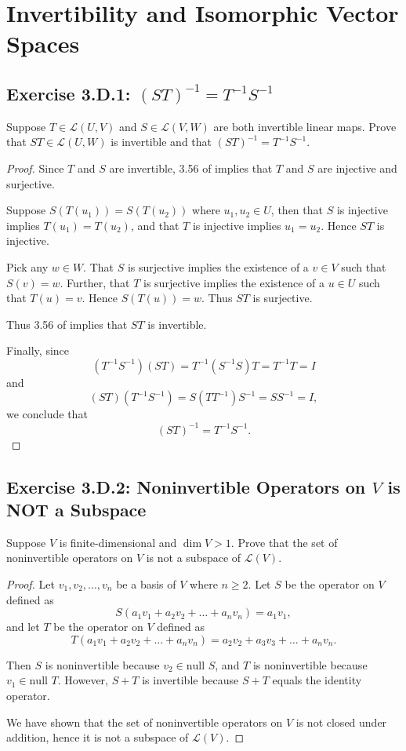 \chapter{Invertibility and Isomorphic Vector Spaces}
\section{Exercise 3.D.1: $(ST)^{-1}=T^{-1}S^{-1}$}
Suppose $T\in\mathcal{L}(U,V)$ and $S\in\mathcal{L}(V,W)$ are both invertible linear maps. Prove that $ST\in\mathcal{L}(U,W)$ is invertible and that $(ST)^{-1}=T^{-1}S^{-1}$.
\begin{proof}
Since $T$ and $S$ are invertible, 3.56 of \cite{axler2014linear} implies that $T$ and $S$ are injective and surjective.

Suppose $S(T(u_1))=S(T(u_2))$ where $u_1,u_2\in U$, then that $S$ is injective implies $T(u_1)=T(u_2)$, and that $T$ is injective implies $u_1=u_2$. Hence $ST$ is injective.

Pick any $w\in W$. That $S$ is surjective implies the existence of a $v\in V$ such that $S(v)=w$. Further, that $T$ is surjective implies the existence of a $u\in U$ such that $T(u)=v$. Hence $S(T(u))=w$. Thus $ST$ is surjective.

Thus 3.56 of \cite{axler2014linear} implies that $ST$ is invertible.

Finally, since\[
(T^{-1}S^{-1})(ST)=T^{-1}(S^{-1}S)T=T^{-1}T=I
\]and\[
(ST)(T^{-1}S^{-1})=S(TT^{-1})S^{-1}=SS^{-1}=I,
\]we conclude that\[
(ST)^{-1}=T^{-1}S^{-1}.
\]
\end{proof}
\section{Exercise 3.D.2: Noninvertible Operators on $V$ is NOT a Subspace}
Suppose $V$ is finite-dimensional and $\dim V>1$. Prove that the set of noninvertible operators on $V$ is not a subspace of $\mathcal{L}(V)$.
\begin{proof}
Let $v_1,v_2,\dots,v_n$ be a basis of $V$ where $n\geqslant 2$. Let $S$ be the operator on $V$ defined as\[
S(a_1v_1+a_2v_2+\dots+a_nv_n)=a_1v_1,
\] and let $T$ be the operator on $V$ defined as\[
T(a_1v_1+a_2v_2+\dots+a_nv_n)=a_2v_2+a_3v_3+\dots+a_nv_n.
\]

Then $S$ is noninvertible because $v_2\in\text{null }S$, and $T$ is noninvertible because $v_1\in\text{null }T$. However, $S+T$ is invertible because $S+T$ equals the identity operator.

We have shown that the set of noninvertible operators on $V$ is not closed under addition, hence it is not a subspace of $\mathcal{L}(V)$.
\end{proof}
